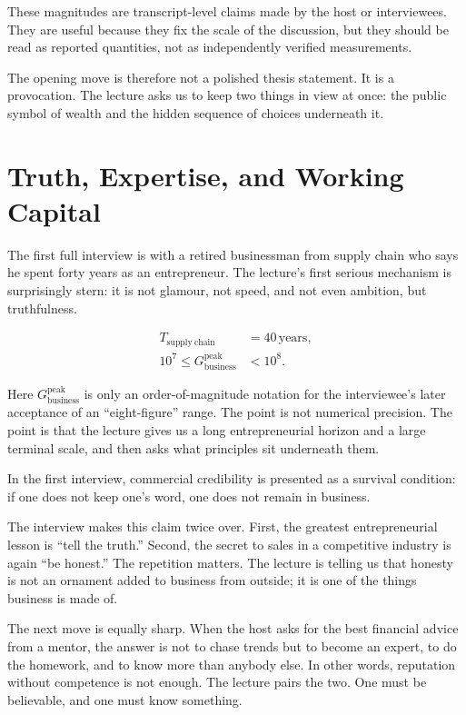 \begin{remark}
These magnitudes are transcript-level claims made by the host or interviewees. They are useful because they fix the scale of the discussion, but they should be read as reported quantities, not as independently verified measurements.
\end{remark}

The opening move is therefore not a polished thesis statement. It is a provocation. The lecture asks us to keep two things in view at once: the public symbol of wealth and the hidden sequence of choices underneath it.

\section{Truth, Expertise, and Working Capital}

The first full interview is with a retired businessman from supply chain who says he spent forty years as an entrepreneur. The lecture's first serious mechanism is surprisingly stern: it is not glamour, not speed, and not even ambition, but truthfulness.

\begin{align}
T_{\mathrm{supply\ chain}} &= 40\,\text{years},\\
10^7 \le G_{\mathrm{business}}^{\mathrm{peak}} &< 10^8.
\end{align}

Here \(G_{\mathrm{business}}^{\mathrm{peak}}\) is only an order-of-magnitude notation for the interviewee's later acceptance of an ``eight-figure'' range. The point is not numerical precision. The point is that the lecture gives us a long entrepreneurial horizon and a large terminal scale, and then asks what principles sit underneath them.

\begin{proposition}
In the first interview, commercial credibility is presented as a survival condition: if one does not keep one's word, one does not remain in business.
\end{proposition}

The interview makes this claim twice over. First, the greatest entrepreneurial lesson is ``tell the truth.'' Second, the secret to sales in a competitive industry is again ``be honest.'' The repetition matters. The lecture is telling us that honesty is not an ornament added to business from outside; it is one of the things business is made of.

The next move is equally sharp. When the host asks for the best financial advice from a mentor, the answer is not to chase trends but to become an expert, to do the homework, and to know more than anybody else. In other words, reputation without competence is not enough. The lecture pairs the two. One must be believable, and one must know something.

